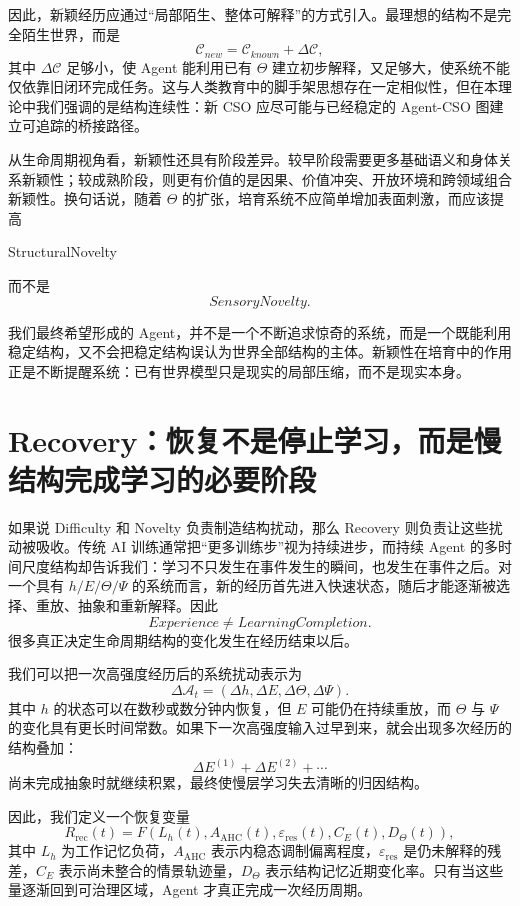 因此，新颖经历应通过“局部陌生、整体可解释”的方式引入。最理想的结构不是完全陌生世界，而是
\[
\mathcal C_{new}
=
\mathcal C_{known}
+
\Delta\mathcal C,
\]
其中 $\Delta\mathcal C$ 足够小，使 Agent 能利用已有 $\Theta$ 建立初步解释，又足够大，使系统不能仅依靠旧闭环完成任务。这与人类教育中的脚手架思想存在一定相似性，但在本理论中我们强调的是结构连续性：新 CSO 应尽可能与已经稳定的 Agent-CSO 图建立可追踪的桥接路径。

从生命周期视角看，新颖性还具有阶段差异。较早阶段需要更多基础语义和身体关系新颖性；较成熟阶段，则更有价值的是因果、价值冲突、开放环境和跨领域组合新颖性。换句话说，随着 $\Theta$ 的扩张，培育系统不应简单增加表面刺激，而应该提高
\begin{statementbox}
StructuralNovelty
\end{statementbox}
而不是
\[
SensoryNovelty.
\]

我们最终希望形成的 Agent，并不是一个不断追求惊奇的系统，而是一个既能利用稳定结构，又不会把稳定结构误认为世界全部结构的主体。新颖性在培育中的作用正是不断提醒系统：已有世界模型只是现实的局部压缩，而不是现实本身。

\section{Recovery：恢复不是停止学习，而是慢结构完成学习的必要阶段}

如果说 Difficulty 和 Novelty 负责制造结构扰动，那么 Recovery 则负责让这些扰动被吸收。传统 AI 训练通常把“更多训练步”视为持续进步，而持续 Agent 的多时间尺度结构却告诉我们：学习不只发生在事件发生的瞬间，也发生在事件之后。对一个具有 $h/E/\Theta/\Psi$ 的系统而言，新的经历首先进入快速状态，随后才能逐渐被选择、重放、抽象和重新解释。因此
\[
\boxed{
Experience
\neq
LearningCompletion.
}
\]
很多真正决定生命周期结构的变化发生在经历结束以后。

我们可以把一次高强度经历后的系统扰动表示为
\[
\Delta\mathcal A_t
=
\left(
\Delta h,
\Delta E,
\Delta\Theta,
\Delta\Psi
\right).
\]
其中 $h$ 的状态可以在数秒或数分钟内恢复，但 $E$ 可能仍在持续重放，而 $\Theta$ 与 $\Psi$ 的变化具有更长时间常数。如果下一次高强度输入过早到来，就会出现多次经历的结构叠加：
\[
\Delta E^{(1)}
+
\Delta E^{(2)}
+\cdots
\]
尚未完成抽象时就继续积累，最终使慢层学习失去清晰的归因结构。

因此，我们定义一个恢复变量
\[
R_{\mathrm{rec}}(t)
=
F
\left(
L_h(t),
A_{\mathrm{AHC}}(t),
\varepsilon_{\mathrm{res}}(t),
C_E(t),
D_{\Theta}(t)
\right),
\]
其中 $L_h$ 为工作记忆负荷，$A_{\mathrm{AHC}}$ 表示内稳态调制偏离程度，$\varepsilon_{\mathrm{res}}$ 是仍未解释的残差，$C_E$ 表示尚未整合的情景轨迹量，$D_\Theta$ 表示结构记忆近期变化率。只有当这些量逐渐回到可治理区域，Agent 才真正完成一次经历周期。

